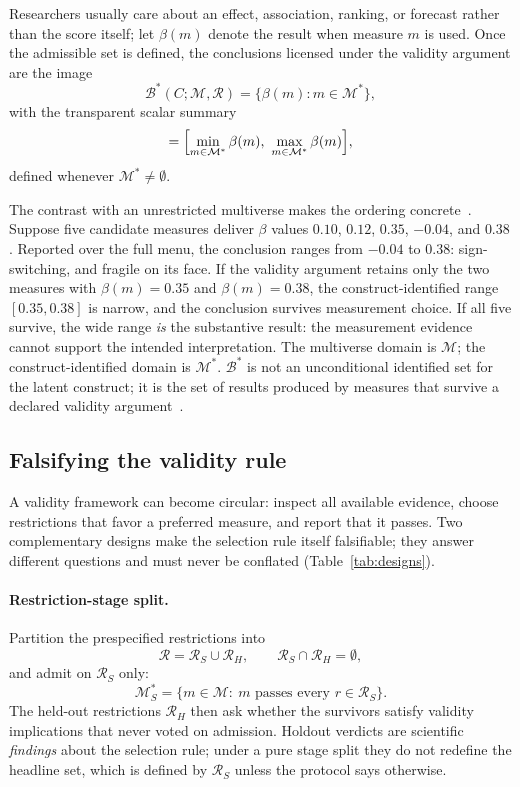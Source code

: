 \documentclass[10pt,letterpaper]{article}
\newcommand{\M}{\ensuremath{\mathcal{M}}}
\newcommand{\Rset}{\mathcal{R}}
\newcommand{\Bset}{\mathcal{B}}
\begin{document}
Researchers usually care about an effect, association, ranking, or forecast rather than the score itself; let $\beta(m)$ denote the result when measure $m$ is used.
Once the admissible set is defined, the conclusions licensed under the validity argument are the image
\begin{equation}
\Bset^*(C;\M,\Rset)=\bigl\{\beta(m):m\in\M^*\bigr\},
\label{eq:Theta}
\end{equation}
with the transparent scalar summary
\begin{equation}
[L,U]=\Bigl[\min_{m\in\M^*}\beta(m),\ \max_{m\in\M^*}\beta(m)\Bigr],
\label{eq:range}
\end{equation}
defined whenever $\M^*\neq\emptyset$.

The contrast with an unrestricted multiverse makes the ordering concrete~\cite{simonsohn2020}.
Suppose five candidate measures deliver $\beta$ values $0.10$, $0.12$, $0.35$, $-0.04$, and $0.38$.
Reported over the full menu, the conclusion ranges from $-0.04$ to $0.38$: sign-switching, and fragile on its face.
If the validity argument retains only the two measures with $\beta(m)=0.35$ and $\beta(m)=0.38$, the construct-identified range $[0.35,0.38]$ is narrow, and the conclusion survives measurement choice.
If all five survive, the wide range \emph{is} the substantive result: the measurement evidence cannot support the intended interpretation.
The multiverse domain is $\M$; the construct-identified domain is $\M^*$.
$\Bset^*$ is not an unconditional identified set for the latent construct; it is the set of results produced by measures that survive a declared validity argument~\cite{manski2003,molinari2020}.

\subsection{Falsifying the validity rule}
\label{sec:falsify}

A validity framework can become circular: inspect all available evidence, choose restrictions that favor a preferred measure, and report that it passes.
Two complementary designs make the selection rule itself falsifiable; they answer different questions and must never be conflated (Table~\ref{tab:designs}).

\paragraph{Restriction-stage split.}
Partition the prespecified restrictions into
\begin{equation}
\Rset=\Rset_S\cup\Rset_H,\qquad \Rset_S\cap\Rset_H=\emptyset,
\label{eq:partition}
\end{equation}
and admit on $\Rset_S$ only:
\begin{equation}
\M^*_S=\bigl\{m\in\M:\ m\text{ passes every }r\in\Rset_S\bigr\}.
\label{eq:Mselect}
\end{equation}
The held-out restrictions $\Rset_H$ then ask whether the survivors satisfy validity implications that never voted on admission.
Holdout verdicts are scientific \emph{findings} about the selection rule; under a pure stage split they do not redefine the headline set, which is defined by $\Rset_S$ unless the protocol says otherwise.
\end{document}
